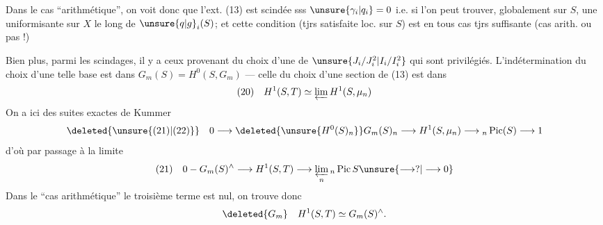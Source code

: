 Dans le cas ``arithmétique'', on voit donc que l'ext. (13) est scindée sss $\unsure{\gamma_i|q_i}=0$ i.e. si l'on peut trouver, globalement sur $S$, une uniformisante sur $X$ le long de $\unsure{q|g}_i(S)$; et cette condition (tjrs satisfaite loc. sur $S$) est en tous cas tjrs suffisante (cas arith. ou pas !)

Bien plus, parmi les scindages, il y a ceux provenant du choix d'une  de $\unsure{J_i/J_i^2|I_i/I_i^2}$ qui sont privilégiés. L'indétermination du choix d'une telle base est dans $G_m(S)=H^0(S,G_m)$ --- celle du choix d'une section de (13) est dans
\[
(20)\quad H^1(S,T)\simeq\varprojlim H^1(S,\mu_n)
\]
On a ici des suites exactes de Kummer
\[
\deleted{\unsure{(21)|(22)}}\quad 0\longrightarrow\deleted{\unsure{H^0(S)_n}}G_m(S)_n\longrightarrow H^1(S,\mu_n)\longrightarrow{}_n\operatorname{Pic}(S)\longrightarrow1
\]
d'où par passage à la limite
\[
(21)\quad 0-G_m(S)^\wedge\longrightarrow H^1(S,T)\longrightarrow\varprojlim_n{}_n\operatorname{Pic}S\unsure{\longrightarrow?|\longrightarrow0}
\]
Dans le ``cas arithmétique'' le troisième terme est nul, on trouve donc
\[
\deleted{G_m}\quad H^1(S,T)\simeq G_m(S)^\wedge.
\]
